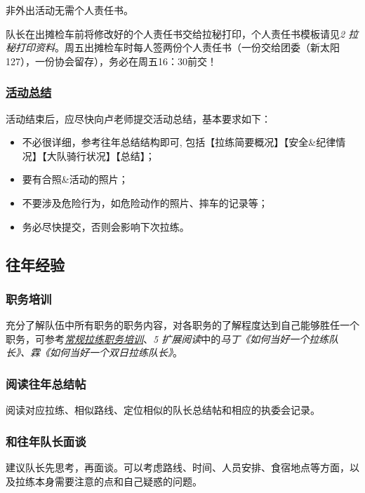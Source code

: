 \documentclass[UTF8]{ctexart}
\begin{document}
非外出活动无需个人责任书。

队长在出摊检车前将修改好的个人责任书交给拉秘打印，个人责任书模板请见{\color{blue}\textit{2 拉秘打印资料}}。周五出摊检车时每人签两份个人责任书（一份交给团委（新太阳127），一份协会留存），务必在周五16：30前交！

\subsubsection[活动总结]{\underline{活动总结}}

活动结束后，应尽快向卢老师提交活动总结，基本要求如下：
\begin{itemize}[nosep,left=4em]
    \item 不必很详细，参考往年总结结构即可, 包括【拉练简要概况】【安全\&纪律情况】【大队骑行状况】【总结】；
    \item 要有合照\&活动的照片；
    \item 不要涉及危险行为，如危险动作的照片、摔车的记录等；
    \item 务必尽快提交，否则会影响下次拉练。
\end{itemize}

\subsection{往年经验}

\subsubsection{职务培训}

充分了解队伍中所有职务的职务内容，对各职务的了解程度达到自己能够胜任一个职务，可参考\href{https://chexie.net/bbs/content/?bid=7&tid=1062&p=1}{\textit{常规拉练职务培训}}、{\color{blue}\textit{5 扩展阅读}}中的{\color{blue}\textit{马丁《如何当好一个拉练队长》、霖《如何当好一个双日拉练队长》}}。

\subsubsection{阅读往年总结帖}

阅读对应拉练、相似路线、定位相似的队长总结帖和相应的执委会记录。

\subsubsection{和往年队长面谈}

建议队长先思考，再面谈。可以考虑路线、时间、人员安排、食宿地点等方面，以及拉练本身需要注意的点和自己疑惑的问题。
\end{document}
